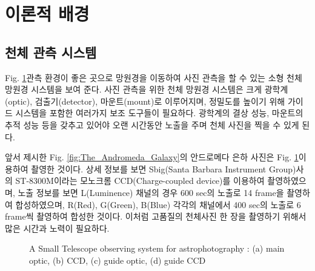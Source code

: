 \section{이론적 배경}

\subsection{천체 관측 시스템}

Fig. \ref{fig:observing_system}\은 관측 환경이 좋은 곳으로 망원경을 이동하여 사진 관측을 할 수 있는 소형 천체 망원경 시스템을 보여 준다. 사진 관측을 위한 천체 망원경 시스템은 크게 광학계(optic), 검출기(detector), 마운트(mount)로 이루어지며, 정밀도를 높이기 위해 가이드 시스템을 포함한 여러가지 보조 도구들이 필요하다. 광학계의 결상 성능, 마운트의 추적 성능 등을 갖추고 있어야 오랜 시간동안 노출을 주며 천체 사진을 찍을 수 있게 된다. 

앞서 제시한 Fig. \ref{fig:The_Andromeda_Galaxy}의 안드로메다 은하 사진은 Fig. \ref{fig:observing_system}\을 이용하여 촬영한 것이다. 상세 정보를 보면 Sbig(Santa Barbara Instrument Group)사의  ST-8300M이라는 모노크롬 CCD(Charge-coupled device)를 이용하여 촬영하였으며, 노출 정보를 보면 L(Luminence) 채널의 경우 600 sec의 노출로 14 frame을 촬영하여 합성하였으며, R(Red), G(Green), B(Blue) 각각의 채널에서 400 sec의 노출로 6 frame씩 촬영하여 합성한 것이다. 이처럼 고품질의 천체사진 한 장을 촬영하기 위해서 많은 시간과 노력이 필요하다. 

\begin{figure}[h]
	\caption{A Small Telescope observing system for astrophotography : (a) main optic, (b) CCD, (c) guide optic, (d) guide CCD}
	\label{fig:observing_system}
\end{figure}

